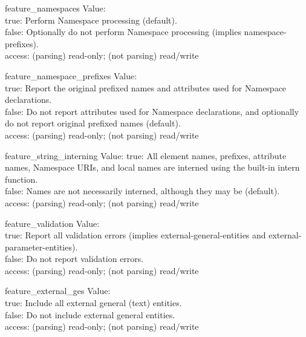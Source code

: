 \begin{datadesc}{feature_namespaces}
  Value: \\
  true: Perform Namespace processing (default).\\
  false: Optionally do not perform Namespace processing
         (implies namespace-prefixes).\\
  access: (parsing) read-only; (not parsing) read/write\\
\end{datadesc}

\begin{datadesc}{feature_namespace_prefixes}
  Value: \\
  true: Report the original prefixed names and attributes used for Namespace
        declarations.\\
  false: Do not report attributes used for Namespace declarations, and
         optionally do not report original prefixed names (default).\\
  access: (parsing) read-only; (not parsing) read/write  
\end{datadesc}

\begin{datadesc}{feature_string_interning}
  Value: 
  true: All element names, prefixes, attribute names, Namespace URIs, and
        local names are interned using the built-in intern function.\\
  false: Names are not necessarily interned, although they may be (default).\\
  access: (parsing) read-only; (not parsing) read/write
\end{datadesc}

\begin{datadesc}{feature_validation}
  Value: \\
  true: Report all validation errors (implies external-general-entities and
        external-parameter-entities).\\
  false: Do not report validation errors.\\
  access: (parsing) read-only; (not parsing) read/write
\end{datadesc}

\begin{datadesc}{feature_external_ges}
  Value: \\
  true: Include all external general (text) entities.\\
  false: Do not include external general entities.\\
  access: (parsing) read-only; (not parsing) read/write
\end{datadesc}

